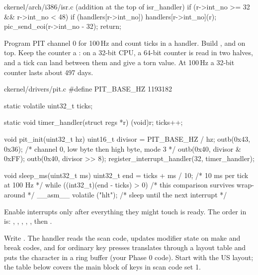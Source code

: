 \documentclass[11pt,a4paper]{article}
\begin{document}
\begin{lst}{c}{kernel/arch/i386/isr.c (addition at the top of isr_handler)}
if (r->int_no >= 32 && r->int_no < 48) {
    if (handlers[r->int_no])
        handlers[r->int_no](r);
    pic_send_eoi(r->int_no - 32);
    return;
}
\end{lst}

Program PIT channel 0 for 100\,Hz and count ticks in a handler. Build ,
 and  on top. Keep the counter a : on a 32-bit CPU, a
64-bit counter is read in two halves, and a tick can land between them and give a torn value. At 100\,Hz a 32-bit
counter lasts about 497 days.

\begin{lst}{c}{kernel/drivers/pit.c}
#define PIT_BASE_HZ 1193182

static volatile uint32_t ticks;

static void timer_handler(struct regs *r) { (void)r; ticks++; }

void pit_init(uint32_t hz)
{
    uint16_t divisor = PIT_BASE_HZ / hz;
    outb(0x43, 0x36);                   /* channel 0, low byte then high byte, mode 3 */
    outb(0x40, divisor & 0xFF);
    outb(0x40, divisor >> 8);
    register_interrupt_handler(32, timer_handler);
}

void sleep_ms(uint32_t ms)
{
    uint32_t end = ticks + ms / 10;     /* 10 ms per tick at 100 Hz */
    while ((int32_t)(end - ticks) > 0)  /* this comparison survives wrap-around */
        __asm__ volatile ("hlt");       /* sleep until the next interrupt */
}
\end{lst}

Enable interrupts only after everything they might touch is ready. The order in  is:
, , , , , then
.

Write . The handler reads the scan code, updates modifier state on make and break
codes, and for ordinary key presses translates through a layout table and puts the character in a ring buffer (your
Phase 0 code). Start with the US layout; the table below covers the main block of keys in scan code set 1.
\end{document}

